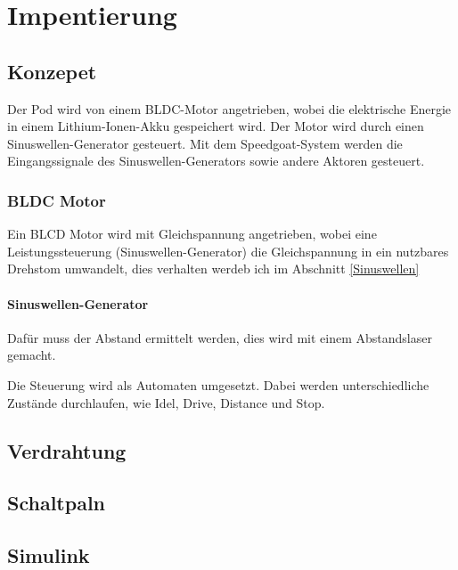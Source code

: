 \chapter{Impentierung}

\section{Konzepet}
Der Pod wird von einem BLDC-Motor angetrieben, wobei die elektrische Energie in einem Lithium-Ionen-Akku gespeichert wird. Der Motor wird durch einen Sinuswellen-Generator gesteuert. Mit dem Speedgoat-System werden die Eingangssignale des Sinuswellen-Generators sowie andere Aktoren gesteuert.

\subsection{BLDC Motor}
Ein BLCD Motor wird mit Gleichspannung angetrieben, wobei eine Leistungssteuerung (Sinuswellen-Generator) die Gleichspannung in ein nutzbares Drehstom umwandelt, dies verhalten werdeb ich im Abschnitt \ref{Sinuswellen} 
\label{Sinuswellen}
\subsubsection{Sinuswellen-Generator}


Dafür muss der Abstand ermittelt werden, dies wird mit einem Abstandslaser gemacht.

Die Steuerung wird als Automaten umgesetzt. Dabei werden unterschiedliche Zustände durchlaufen, wie Idel, Drive, Distance und Stop.
\newline


\section{Verdrahtung}

\section{Schaltpaln}

\section{Simulink}

\
